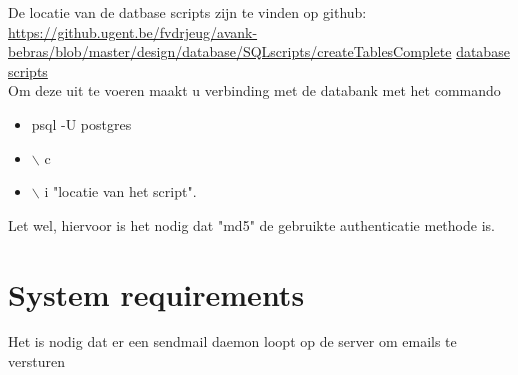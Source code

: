 \documentclass[10pt,a4paper]{article}
\begin{document}
De locatie van de datbase scripts zijn te vinden op github:
\url{https://github.ugent.be/fvdrjeug/avank-bebras/blob/master/design/database/SQLscripts/createTablesComplete}
\href{https://github.ugent.be/fvdrjeug/avank-bebras/blob/master/design/database/SQLscripts/createTablesComplete}{database scripts}\\

Om deze uit te voeren maakt u verbinding met de databank met het commando
\begin{itemize}
\item psql -U postgres
\item $\backslash$ c
\item $\backslash$ i "locatie van het script".
\end{itemize} 
Let wel, hiervoor is het nodig dat "md5" de gebruikte authenticatie methode is.

\section*{System requirements}
Het is nodig dat er een sendmail daemon loopt op de server om emails te versturen
\end{document}
